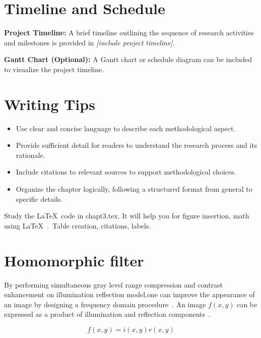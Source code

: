 	\section{Timeline and Schedule}
	\textbf{Project Timeline:} A brief timeline outlining the sequence of research activities and milestones is provided in \textit{[include project timeline]}.
	
	\textbf{Gantt Chart (Optional):} A Gantt chart or schedule diagram can be included to visualize the project timeline.
	
	\section{Writing Tips}
	\begin{itemize}
		\item Use clear and concise language to describe each methodological aspect.
		\item Provide sufficient detail for readers to understand the research process and its rationale.
		\item Include citations to relevant sources to support methodological choices.
		\item Organize the chapter logically, following a structured format from general to specific details.
	\end{itemize}
	






Study the \LaTeX\ code in chapt3.tex.
It will help you for figure insertion, math using \LaTeX\ .\, Table creation,
citations, labels.
\section{Homomorphic filter} 
By performing simultaneous gray level range compression and contrast enhancement on illumination reflection model,one can improve the appearance of an image by designing a frequency domain procedure~\cite{man87}.
An image $f(x,y)$ can be expressed as a product of illumination and reflection components~\cite{sam09}.


\begin{equation}
f(x,y)=i(x,y)r(x,y)
\end{equation}

